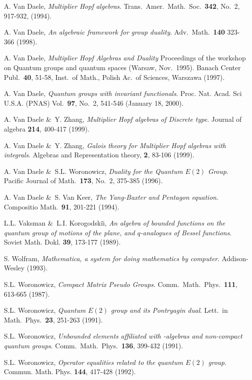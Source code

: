 \begin{thebibliography}{99}
 {\sc A. Van Daele},
   {\em Multiplier Hopf algebras}\@.
   Trans.\ Amer.\ Math.\ Soc.\ {\bf 342}, No.\ 2, 917-932, (1994).

 {\sc A. Van Daele},
   {\em An algebraic framework for group duality}\@.
   Adv.\ Math.\ {\bf 140} 323-366 (1998).

 {\sc A. Van Daele},
   {\em Multiplier Hopf Algebras and Duality\/}
   Proceedings of the workshop on Quantum groups and quantum spaces
   (Warsaw, Nov.\ 1995).
   Banach Center Publ.\ {\bf 40}, 51-58,
   Inst.\ of Math., Polish Ac.\ of Sciences,
   Warszawa (1997).

 {\sc A. Van Daele},
   {\em Quantum groups with invariant functionals}\@.
   Proc. Nat. Acad. Sci U.S.A. (PNAS) Vol.\ {\bf 97}, No.\ 2, 541-546 (January 18, 2000).

 {\sc A. Van Daele \&\ Y. Zhang},
   {\em Multiplier Hopf algebras of Discrete type}\@.
   Journal of algebra {\bf 214}, 400-417 (1999).

 {\sc A. Van Daele \&\ Y. Zhang},
   {\em Galois theory for Multiplier Hopf algebras with integrals}\@.
   Algebras and Representation theory, {\bf 2}, 83-106 (1999).

 {\sc A. Van Daele \&\ S.L. Woronowicz},
   {\em Duality for the Quantum $E(2)$ Group}\@.
   Pacific Journal of Math.\ {\bf 173}, No.\ 2, 375-385 (1996).

 {\sc A. Van Daele \&\ S. Van Keer},
   {\em The Yang-Baxter and Pentagon equation}\@.
   Compositio Math.\ {\bf 91}, 201-221 (1994).

 {\sc L.L. Vaksman \&\ L.I.
         Korogodski\u{\i}},
         {\em An algebra of bounded functions on the quantum group of motions
              of the plane, and $q$-analogues of Bessel functions}\@.
         Soviet Math. Dokl. {\bf 39}, 173-177 (1989).

 {\sc S. Wolfram},
   {\em Mathematica, a system for doing mathematics by computer}\@.
   Addison-Wesley (1993).

 {\sc S.L. Woronowicz},
   {\em Compact Matrix Pseudo Groups}\@.
   Comm.\ Math.\ Phys.\ {\bf 111}, 613-665 (1987).

 {\sc S.L. Woronowicz},
   {\em Quantum $E(2)$ group and its Pontryagin dual}\@.
   Lett.\ in Math.\ Phys.\ {\bf 23}, 251-263 (1991).

 {\sc S.L. Woronowicz},
   {\em Unbounded elements affiliated with \Cstar-algebras and non-compact quantum groups}\@.
   Comm.\ Math.\ Phys.\ {\bf 136}, 399-432 (1991).

 {\sc S.L. Woronowicz},
   {\em  Operator equalities related to the quantum $E(2)$ group}\@.
         Commun. Math. Phys. {\bf 144}, 417-428 (1992).
\end{thebibliography}
